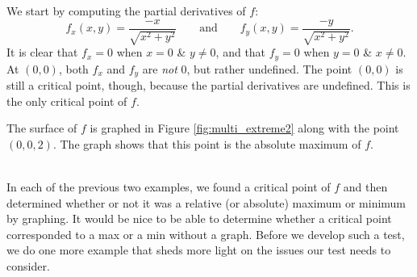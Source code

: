 {We start by computing the partial derivatives of $f$:
$$f_x(x,y) = \frac{-x}{\sqrt{x^2+y^2}}\qquad \text{and}\qquad f_y(x,y) = \frac{-y}{\sqrt{x^2+y^2}}.$$
It is clear that $f_x=0$ when $x=0$ \& $y\neq0$, and that $f_y=0$ when $y=0$ \& $x\neq0$. At $(0,0)$, both $f_x$ and $f_y$ are \textit{not} $0$, but rather undefined. The point $(0,0)$ is still a critical point, though, because the partial derivatives are undefined. This is the only critical point of $f$.

The surface of $f$ is graphed in Figure \ref{fig:multi_extreme2} along with the point $(0,0,2)$. The graph shows that this point is the absolute maximum of $f$.
}\\

In each of the previous two examples, we found a critical point of $f$ and then determined whether or not it was a relative (or absolute) maximum or minimum by graphing. It would be nice to be able to determine whether a critical point corresponded to a max or a min without a graph. Before we develop such a test, we do one more example that sheds more light on the issues our test needs to consider.\\

